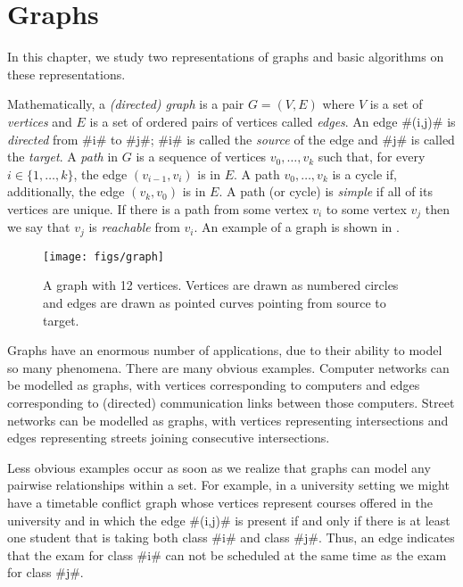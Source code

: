 \chapter{Graphs}


In this chapter, we study two representations of graphs and basic
algorithms on these representations.  

Mathematically, a \emph{(directed) graph} is a pair $G=(V,E)$ where
$V$ is a set of \emph{vertices} and $E$ is a set of ordered pairs
of vertices called \emph{edges}.  An edge #(i,j)# is \emph{directed}
from #i# to #j#;  #i# is called the \emph{source} of the edge and #j#
is called the \emph{target}.  A \emph{path} in $G$ is a sequence of
vertices $v_0,\ldots,v_k$ such that, for every $i\in\{1,\ldots,k\}$,
the edge $(v_{i-1},v_{i})$ is in $E$.  A path $v_0,\ldots,v_k$ is a
cycle if, additionally, the edge $(v_k,v_0)$ is in $E$.  A path (or
cycle) is \emph{simple} if all of its vertices are unique.  If there is
a path from some vertex $v_i$ to some vertex $v_j$ then we say that $v_j$
is \emph{reachable} from $v_i$.
An example of a graph is shown in .

\begin{figure}
  \begin{center}
    \texttt{[image: figs/graph]}
  \end{center}
  \caption{A graph with 12 vertices.  Vertices are drawn as numbered circles and edges are drawn as pointed curves pointing from source to target.}
\end{figure}


Graphs have an enormous number of applications, due to their ability
to model so many phenomena. There are many obvious examples. Computer
networks can be modelled as graphs, with vertices corresponding to
computers and edges corresponding to (directed) communication links
between those computers.  Street networks can be modelled as graphs,
with vertices representing intersections and edges representing streets
joining consecutive intersections.

Less obvious examples occur as soon as we realize that graphs can model
any pairwise relationships within a set. For example, in a university
setting we might have a timetable conflict graph whose vertices represent
courses offered in the university and in which the edge #(i,j)# is present
if and only if there is at least one student that is taking both class
#i# and class #j#.  Thus, an edge indicates that the exam for class #i#
can not be scheduled at the same time as the exam for class #j#.

